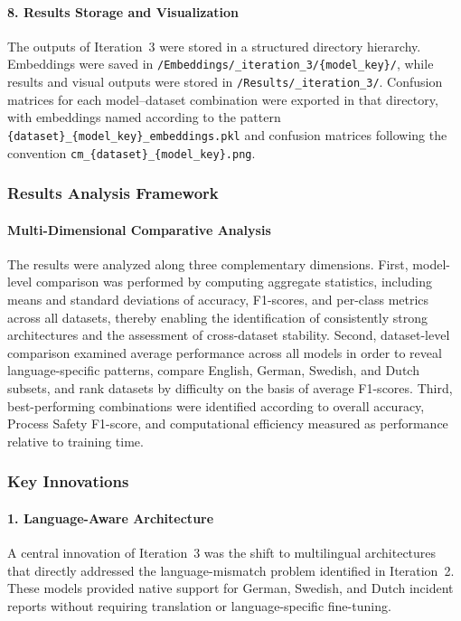 \documentclass[11pt, titlepage, bibliography=totoc]{scrreprt}
\begin{document}
\paragraph{8. Results Storage and Visualization}
The outputs of Iteration~3 were stored in a structured directory hierarchy. Embeddings were saved in \texttt{/Embeddings/\_iteration\_3/\{model\_key\}/}, while results and visual outputs were stored in \texttt{/Results/\_iteration\_3/}. Confusion matrices for each model--dataset combination were exported in that directory, with embeddings named according to the pattern \texttt{\{dataset\}\_\{model\_key\}\_embeddings.pkl} and confusion matrices following the convention \texttt{cm\_\{dataset\}\_\{model\_key\}.png}.

\subsubsection{Results Analysis Framework}

\paragraph{Multi-Dimensional Comparative Analysis}
The results were analyzed along three complementary dimensions. First, model-level comparison was performed by computing aggregate statistics, including means and standard deviations of accuracy, F1-scores, and per-class metrics across all datasets, thereby enabling the identification of consistently strong architectures and the assessment of cross-dataset stability. Second, dataset-level comparison examined average performance across all models in order to reveal language-specific patterns, compare English, German, Swedish, and Dutch subsets, and rank datasets by difficulty on the basis of average F1-scores. Third, best-performing combinations were identified according to overall accuracy, Process Safety F1-score, and computational efficiency measured as performance relative to training time.

\subsubsection{Key Innovations}

\paragraph{1. Language-Aware Architecture}
A central innovation of Iteration~3 was the shift to multilingual architectures that directly addressed the language-mismatch problem identified in Iteration~2. These models provided native support for German, Swedish, and Dutch incident reports without requiring translation or language-specific fine-tuning.
\end{document}
